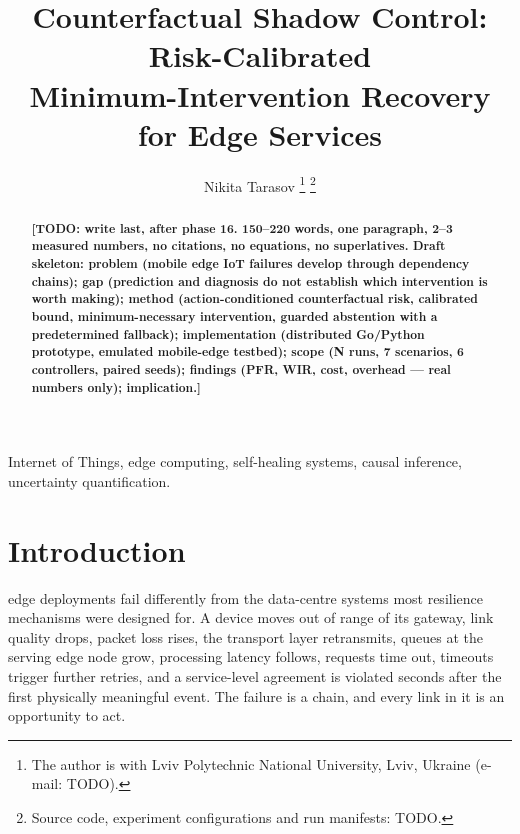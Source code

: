 \documentclass[journal]{IEEEtran}
\newcommand{\TODO}[1]{\textbf{[TODO: #1]}}
\begin{document}
\title{Counterfactual Shadow Control: Risk-Calibrated\\
Minimum-Intervention Recovery for Edge Services}

\author{Nikita Tarasov%
\thanks{The author is with Lviv Polytechnic National University, Lviv, Ukraine
(e-mail: TODO).}%
\thanks{Source code, experiment configurations and run manifests: TODO.}}

\maketitle

\begin{abstract}
\TODO{write last, after phase 16. 150--220 words, one paragraph, 2--3
measured numbers, no citations, no equations, no superlatives. Draft skeleton:
problem (mobile edge IoT failures develop through dependency chains); gap
(prediction and diagnosis do not establish which intervention is worth making);
method (action-conditioned counterfactual risk, calibrated bound,
minimum-necessary intervention, guarded abstention with a predetermined fallback); implementation (distributed
Go/Python prototype, emulated mobile-edge testbed); scope (N runs, 7 scenarios,
6 controllers, paired seeds); findings (PFR, WIR, cost, overhead --- real
numbers only); implication.}
\end{abstract}

\begin{IEEEkeywords}
Internet of Things, edge computing, self-healing systems, causal inference,
uncertainty quantification.
\end{IEEEkeywords}

\section{Introduction}
 edge deployments \cite{shi2016edge} fail differently
from the data-centre systems most resilience mechanisms were designed for. A
device moves out of range of its gateway, link quality drops, packet loss rises,
the transport layer retransmits, queues at the serving edge node grow,
processing latency follows, requests time out, timeouts trigger further retries,
and a service-level agreement is violated seconds after the first physically
meaningful event. The failure is a chain, and every link in it is an opportunity
to act.
\end{document}
